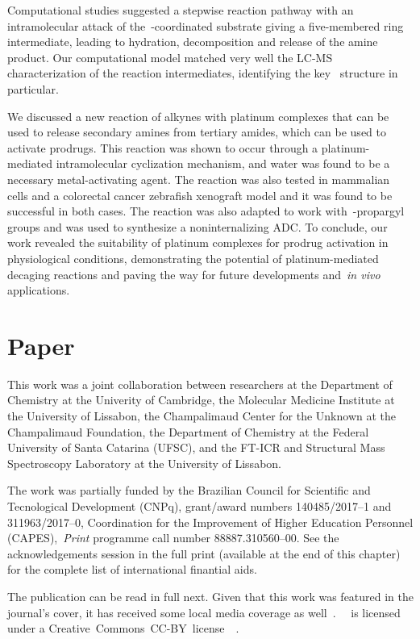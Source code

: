 Computational studies suggested a stepwise reaction pathway with an intramolecular attack
of the~-coordinated substrate giving a five-membered ring intermediate,
leading to hydration,
decomposition and release of the amine product.
Our computational model matched very well the LC-MS characterization of the reaction intermediates,
identifying the key~ structure in particular.

We discussed a new reaction of alkynes with platinum complexes that can be used to release secondary amines from tertiary amides,
which can be used to activate prodrugs.
This reaction was shown to occur through a platinum-mediated intramolecular cyclization mechanism,
and water was found to be a necessary metal-activating agent.
The reaction was also tested in mammalian cells and a colorectal cancer zebrafish xenograft model
and it was found to be successful in both cases.
The reaction was also adapted to work with~-propargyl groups and was used to synthesize a noninternalizing ADC.\@
To conclude,
our work revealed the suitability of platinum complexes for prodrug activation in physiological conditions,
demonstrating the potential of platinum-mediated decaging reactions
and paving the way for future developments and~\emph{in vivo} applications.

\section{Paper}

This work was a joint collaboration between researchers
at the Department of Chemistry at the Univerity of Cambridge,
the Molecular Medicine Institute at the University of Lissabon,
the Champalimaud Center for the Unknown at the Champalimaud Foundation,
the Department of Chemistry at the Federal University of Santa Catarina (UFSC),
and the FT-ICR and Structural Mass Spectroscopy Laboratory at the University of Lissabon.

The work was partially funded by the Brazilian Council for Scientific and Tecnological Development (CNPq),
grant/award numbers 140485/2017--1 and 311963/2017--0,
Coordination for the Improvement of Higher Education Personnel (CAPES),~\emph{Print} programme call number 88887.310560--00.
See the acknowledgements session in the full print
(available at the end of this chapter)
for the complete list of international finantial aids.

The publication can be read in full next.
Given that this work was featured in the journal's cover,
it has received some local media coverage as well~\cite{noticias-da-ufsc2020}.~\citeauthor{Oliveira_2020}~\cite{Oliveira_2020}
is licensed under a
Creative~Commons~CC-BY~license~\ccby~\cite{ACS_CCBY_2014}.


